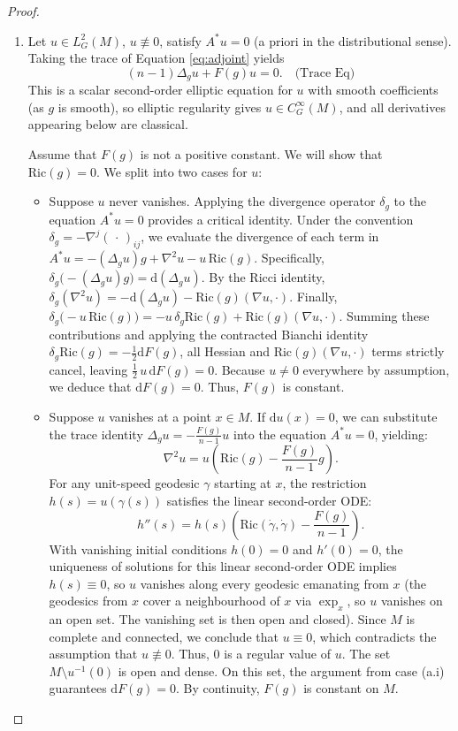 \documentclass[12pt,a4paper]{amsart}
\theoremstyle{plain}
\theoremstyle{definition}
\theoremstyle{remark}
\newcommand{\ga}{\mathit{g}} %
\begin{document}
\begin{proof}
    \begin{enumerate}[label=\textup{(\alph*)}, font=\upshape]
        \item Let $u \in L^2_G(M)$, $u \not\equiv 0$, satisfy $A^*u = 0$ (a priori in the distributional sense). Taking the trace of Equation \eqref{eq:adjoint} yields
        $$(n-1)\Delta_{\ga} u + F(\ga)u = 0. \quad \text{(Trace Eq)}$$
        This is a scalar second-order elliptic equation for $u$ with smooth coefficients (as $\ga$ is smooth), so elliptic regularity gives $u \in C^\infty_G(M)$, and all derivatives appearing below are classical.
        
        Assume that $F(\ga)$ is not a positive constant. We will show that $\mathrm{Ric}(\ga) = 0$. We split into two cases for $u$:
        \begin{itemize}
        \item[(a.i)] Suppose $u$ never vanishes. Applying the divergence operator $\delta_{\ga}$ to the equation $A^*u = 0$ provides a critical identity. Under the convention $\delta_{\ga} = -\nabla^j(\,\cdot\,)_{ij}$, we evaluate the divergence of each term in $A^*u = -(\Delta_{\ga} u)\ga + \nabla^2 u - u\,\mathrm{Ric}(\ga)$. Specifically, $\delta_{\ga}\bigl(-(\Delta_{\ga}u)\ga\bigr) = \mathrm{d}(\Delta_{\ga}u)$. By the Ricci identity, $\delta_{\ga}(\nabla^2u) = -\mathrm{d}(\Delta_{\ga}u) - \mathrm{Ric}(\ga)(\nabla u,\cdot)$. Finally, $\delta_{\ga}\bigl(-u\,\mathrm{Ric}(\ga)\bigr) = -u\,\delta_{\ga}\mathrm{Ric}(\ga) + \mathrm{Ric}(\ga)(\nabla u,\cdot)$. Summing these contributions and applying the contracted Bianchi identity $\delta_{\ga}\mathrm{Ric}(\ga) = -\tfrac{1}{2}\mathrm{d} F(\ga)$, all Hessian and $\mathrm{Ric}(\ga)(\nabla u,\cdot)$ terms strictly cancel, leaving $\tfrac{1}{2}\,u\,\mathrm{d} F(\ga) = 0$. Because $u \neq 0$ everywhere by assumption, we deduce that $\mathrm{d} F(\ga) = 0$. Thus, $F(\ga)$ is constant.
          \item[(a.ii)] Suppose $u$ vanishes at a point $x \in M$. If $\mathrm{d} u(x) = 0$, we can substitute the trace identity $\Delta_{\ga} u = -\frac{F(\ga)}{n-1}u$ into the equation $A^*u = 0$, yielding:
          $$ \nabla^2 u = u \left( \mathrm{Ric}(\ga) - \frac{F(\ga)}{n-1}\ga \right). $$
          For any unit-speed geodesic $\gamma$ starting at $x$, the restriction $h(s) = u(\gamma(s))$ satisfies the linear second-order ODE:
          $$ h''(s) = h(s) \left( \mathrm{Ric}(\dot{\gamma}, \dot{\gamma}) - \frac{F(\ga)}{n-1} \right). $$
          With vanishing initial conditions $h(0)=0$ and $h'(0)=0$, the uniqueness of solutions for this linear second-order ODE implies $h(s) \equiv 0$, so $u$ vanishes along every geodesic emanating from $x$ (the geodesics from $x$ cover a neighbourhood of $x$ via $\exp_x$, so $u$ vanishes on an open set. The vanishing set is then open and closed). Since $M$ is complete and connected, we conclude that $u \equiv 0$, which contradicts the assumption that $u \not\equiv 0$. Thus, $0$ is a regular value of $u$. The set $M \setminus u^{-1}(0)$ is open and dense. On this set, the argument from case (a.i) guarantees $\mathrm{d} F(\ga) = 0$. By continuity, $F(\ga)$ is constant on $M$.

\end{itemize}
\end{enumerate}
\end{proof}
\end{document}
